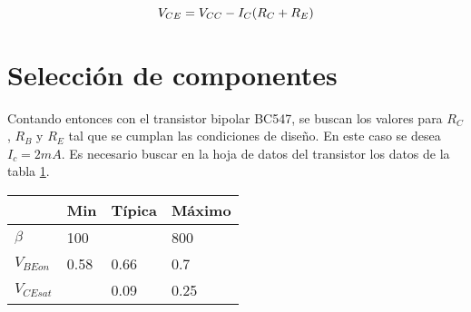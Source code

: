 \begin{equation}
    V_{CE}=V_{CC}-I_C(R_C+R_E)
    \label{eq_V_CE}
\vspace{8mm}
\end{equation}

\section{Selección de componentes}

Contando entonces con el transistor bipolar BC547, se buscan los valores para $R_C$, $R_B$ y $R_E$ tal que se cumplan las condiciones de diseño.
En este caso se desea $I_c =  2mA$. Es necesario buscar en la hoja de datos del transistor los datos de la tabla \ref{table:parametros transistor}.
\begin{table}[ht]
    \centering
    \begin{tabular}{l|l|l|l}
                  & Min  & Típica & Máximo \\ \hline
    $\beta$       & 100  &        & 800    \\ \hline
    $V_{BEon}$    & 0.58 & 0.66   & 0.7    \\ \hline
    $V_{CEsat}$   &      & 0.09   & 0.25  
    \end{tabular} \label{table:parametros transistor}
\end{table}

